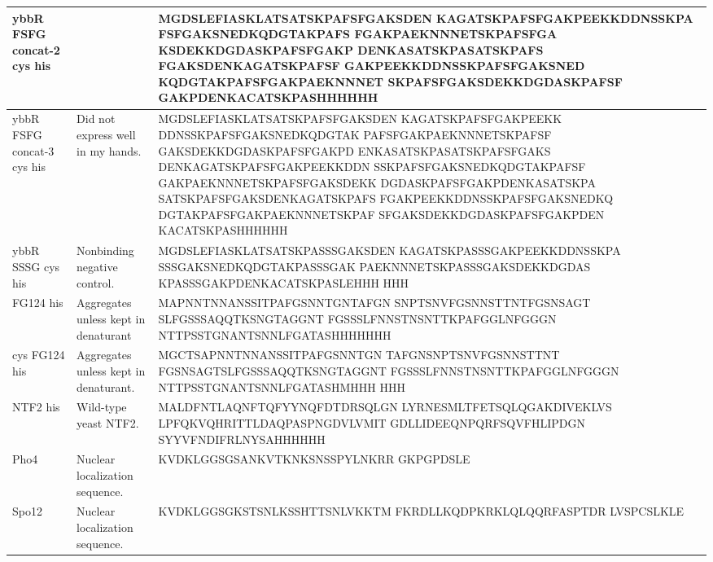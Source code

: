 \begin{center}
\begin{longtable}{p{3cm}p{3.5cm}p{8cm}}
ybbR FSFG concat-2 cys his& & MGDSLEFIASKLATSATSKPAFSFGAKSDEN
KAGATSKPAFSFGAKPEEKKDDNSSKPA
FSFGAKSNEDKQDGTAKPAFS
FGAKPAEKNNNETSKPAFSFGA
KSDEKKDGDASKPAFSFGAKP
DENKASATSKPASATSKPAFS
FGAKSDENKAGATSKPAFSF
GAKPEEKKDDNSSKPAFSFGAKSNED
KQDGTAKPAFSFGAKPAEKNNNET
SKPAFSFGAKSDEKKDGDASKPAFSF
GAKPDENKACATSKPASHHHHHH\\
      \hline
	ybbR FSFG concat-3 cys his& Did not express well in my hands.& MGDSLEFIASKLATSATSKPAFSFGAKSDEN
KAGATSKPAFSFGAKPEEKK
DDNSSKPAFSFGAKSNEDKQDGTAK
PAFSFGAKPAEKNNNETSKPAFSF
GAKSDEKKDGDASKPAFSFGAKPD
ENKASATSKPASATSKPAFSFGAKS
DENKAGATSKPAFSFGAKPEEKKDDN
SSKPAFSFGAKSNEDKQDGTAKPAFSF
GAKPAEKNNNETSKPAFSFGAKSDEKK
DGDASKPAFSFGAKPDENKASATSKPA
SATSKPAFSFGAKSDENKAGATSKPAFS
FGAKPEEKKDDNSSKPAFSFGAKSNEDKQ
DGTAKPAFSFGAKPAEKNNNETSKPAF
SFGAKSDEKKDGDASKPAFSFGAKPDEN
KACATSKPASHHHHHH\\
\hline
ybbR SSSG cys his & Nonbinding negative control. & MGDSLEFIASKLATSATSKPASSSGAKSDEN
KAGATSKPASSSGAKPEEKKDDNSSKPA
SSSGAKSNEDKQDGTAKPASSSGAK
PAEKNNNETSKPASSSGAKSDEKKDGDAS
KPASSSGAKPDENKACATSKPASLEHHH
HHH\\
	\hline

	FG124 his& Aggregates unless kept in denaturant & MAPNNTNNANSSITPAFGSNNTGNTAFGN
SNPTSNVFGSNNSTTNTFGSNSAGT
SLFGSSSAQQTKSNGTAGGNT
FGSSSLFNNSTNSNTTKPAFGGLNFGGGN
NTTPSSTGNANTSNNLFGATASHHHHHHH\\
\hline
	cys FG124 his& Aggregates unless kept in denaturant. & MGCTSAPNNTNNANSSITPAFGSNNTGN
TAFGNSNPTSNVFGSNNSTTNT
FGSNSAGTSLFGSSSAQQTKSNGTAGGNT
FGSSSLFNNSTNSNTTKPAFGGLNFGGGN
NTTPSSTGNANTSNNLFGATASHMHHH
HHH\\
\hline

NTF2 his & Wild-type yeast NTF2. & MALDFNTLAQNFTQFYYNQFDTDRSQLGN
LYRNESMLTFETSQLQGAKDIVEKLVS
LPFQKVQHRITTLDAQPASPNGDVLVMIT
GDLLIDEEQNPQRFSQVFHLIPDGN
SYYVFNDIFRLNYSAHHHHHH\\
	\hline
Pho4 & Nuclear localization sequence. & KVDKLGGSGSANKVTKNKSNSSPYLNKRR
GKPGPDSLE \\
\hline
Spo12 & Nuclear localization sequence. & KVDKLGGSGKSTSNLKSSHTTSNLVKKTM
FKRDLLKQDPKRKLQLQQRFASPTDR
LVSPCSLKLE
 \\

\end{longtable}
\end{center}

